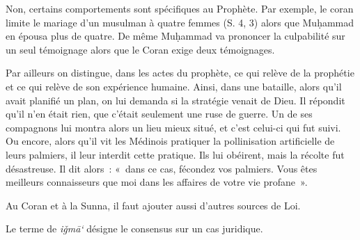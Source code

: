 Non, certains comportements sont spécifiques au Prophète. Par exemple,
le coran limite le mariage d'un musulman à quatre femmes (S. 4, 3) alors
que Muḥammad en épousa plus de quatre. De même Muḥammad va prononcer la
culpabilité sur un seul témoignage alors que le Coran exige deux
témoignages.

Par ailleurs on distingue, dans les actes du prophète, ce qui relève de
la prophétie et ce qui relève de son expérience humaine. Ainsi, dans une
bataille, alors qu'il avait planifié un plan, on lui demanda si la
stratégie venait de Dieu. Il répondit qu'il n'en était rien, que c'était
seulement une ruse de guerre. Un de ses compagnons lui montra alors un
lieu mieux situé, et c'est celui-ci qui fut suivi. Ou encore, alors
qu'il vit les Médinois pratiquer la pollinisation artificielle de leurs
palmiers, il leur interdit cette pratique. Ils lui obéirent, mais la
récolte fut désastreuse. Il dit alors~: «~dans ce cas, fécondez vos
palmiers. Vous êtes meilleurs connaisseurs que moi dans les affaires de
votre vie profane~».

Au Coran et à la Sunna, il faut ajouter aussi d'autres sources de Loi.


\begin{Def}[{iǧmā`}]
Le terme de \emph{iǧmā`} désigne le consensus sur un cas juridique.
\end{Def}


